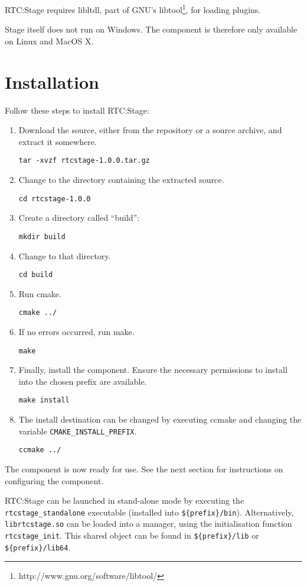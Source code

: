 \documentclass[a4paper,10pt]{article}
\begin{document}
RTC:Stage requires libltdl, part of GNU's
libtool\footnote{http://www.gnu.org/software/libtool/}, for loading plugins.

Stage itself does not run on Windows. The component is therefore only available
on Linux and MacOS X.

\section{Installation}
\label{sec:installation}

Follow these steps to install RTC:Stage:

\begin{enumerate}
  \item Download the source, either from the repository or a source archive,
  and extract it somewhere.

  \verb|tar -xvzf rtcstage-1.0.0.tar.gz|
  \item Change to the directory containing the extracted source.

  \verb|cd rtcstage-1.0.0|
  \item Create a directory called ``build'':

  \verb|mkdir build|
  \item Change to that directory.

  \verb|cd build|
  \item Run cmake.

  \verb|cmake ../|
  \item If no errors occurred, run make.

  \verb|make|
  \item Finally, install the component. Ensure the necessary permissions to
  install into the chosen prefix are available.

  \verb|make install|
  \item The install destination can be changed by executing ccmake and changing
  the variable \verb|CMAKE_INSTALL_PREFIX|.

  \verb|ccmake ../|
\end{enumerate}

The component is now ready for use. See the next section for instructions on
configuring the component.

RTC:Stage can be launched in stand-alone mode by executing the
\verb|rtcstage_standalone| executable (installed into \verb|${prefix}/bin|).
Alternatively, \verb|librtcstage.so| can be loaded into a manager, using the
initialisation function \verb|rtcstage_init|. This shared object can be found
in \verb|${prefix}/lib| or \verb|${prefix}/lib64|.
\end{document}
